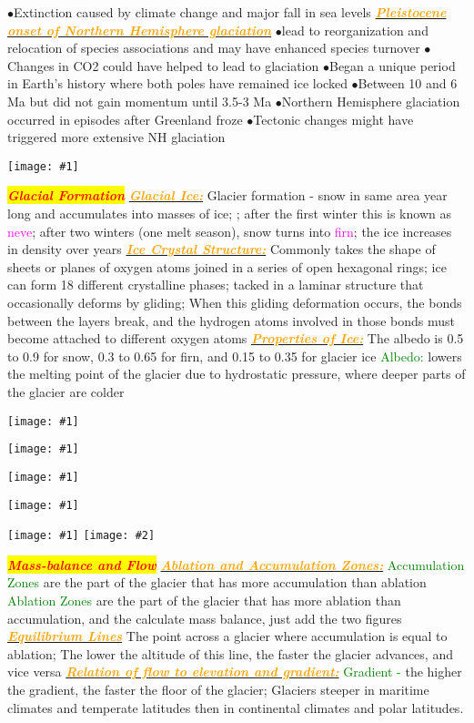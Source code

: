 \documentclass{article}
\newcommand{\ddd}{$\bullet$}
\newcommand{\red}[1]{\textcolor{red}{#1}}
\newcommand{\green}[1]{\textcolor{green}{#1}}
\newcommand{\pink}[1]{\textcolor{magenta}{#1}}
\newcommand{\orange}[1]{\textcolor{orange}{#1}}
\newcommand{\mysection}[1]{\colorbox{yellow}{\textbf{\textit{\red{#1}}}}}
\newcommand{\mysub}[1]{\underline{\textbf{{\textit{\orange{#1}}}}}}
\newcommand{\mysubsub}[1]{{{\green{#1}}}}
\newcommand{\vocab}[1]{{\pink{#1}}}
\newcommand{\fig}[1]{
	\texttt{[image: \#1]}
}
\newcommand{\figtwo}[2]{
	\texttt{[image: \#1]}
	\texttt{[image: \#2]}
}
\begin{document}
\begin{multicols*}{4}
            \ddd Extinction caused by climate change and major fall in sea levels
        \mysub{Pleistocene onset of Northern Hemisphere glaciation}
            \ddd lead to reorganization and relocation of species associations and may have enhanced species turnover
            \ddd Changes in CO2 could have helped to lead to glaciation
            \ddd Began a unique period in Earth’s history where both poles have remained ice locked
            \ddd Between 10 and 6 Ma but did not gain momentum until 3.5-3 Ma
            \ddd Northern Hemisphere glaciation occurred in episodes after Greenland froze
            \ddd Tectonic changes might have triggered more extensive NH glaciation
        \fig{ice_ages1}
		\mysection{Glacial Formation} %
		\mysub {Glacial Ice:}
		Glacier formation - snow in same area year long and accumulates into masses of ice; ; after the first winter this is known as \vocab{neve}; after two winters (one melt season), snow turns into \vocab{firn}; the ice increases in density over years
		\mysub{Ice Crystal Structure:} 
		Commonly takes the shape of sheets or planes of oxygen atoms joined in a series of open hexagonal rings; ice can form 18 different crystalline phases; tacked in a laminar structure that occasionally deforms by gliding; When this gliding deformation occurs, the bonds between the layers break, and the hydrogen atoms involved in those bonds must become attached to different oxygen atoms
		\mysub{Properties of Ice:} The albedo is 0.5 to 0.9 for snow, 0.3 to 0.65 for firn, and 0.15 to 0.35 for glacier ice
		\mysubsub{Albedo:} lowers the melting point of the glacier due to hydrostatic pressure, where deeper parts of the glacier are colder
	    \fig{hydrology}
	    \fig{landforms}
        \fig{moraines}
        \fig{Glacier_Types}
        \figtwo{glacierflow2}{Larsen_contours}
		\mysection{Mass-balance and Flow}
		\mysub{Ablation and Accumulation Zones:}
		\mysubsub{Accumulation Zones} are the part of the glacier that has more accumulation than ablation
		\mysubsub{Ablation Zones} are the part of the glacier that has more ablation than accumulation, and the calculate mass balance, just add the two figures
		\mysub{Equilibrium Lines} The point across a glacier where accumulation is equal to ablation; The lower the altitude of this line, the faster the glacier advances, and vice versa
		\mysub{Relation of flow to elevation and gradient:}
		\mysubsub{Gradient -} the higher the gradient, the faster the floor of the glacier; Glaciers steeper in maritime climates and temperate latitudes then in continental climates and polar latitudes.

\end{multicols*}
\end{document}
